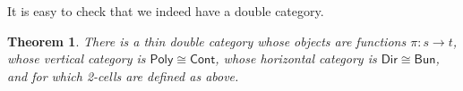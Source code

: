 \documentclass[11pt, article, one side]{memoir}
\theoremstyle{theorem}
\newtheorem{theorem}[equation]{Theorem}
\theoremstyle{definition}
\theoremstyle{remark}
\newcommand{\Cat}[1]{\mathsf{#1}}%
\newcommand{\smset}{\Cat{Set}}
\newcommand{\cont}{\Cat{Cont}}
\newcommand{\bun}{\Cat{Bun}}
\newcommand{\poly}{\Cat{Poly}}
\newcommand{\dir}{\Cat{Dir}}
\begin{document}
It is easy to check that we indeed have a double category.
\begin{theorem}
There is a thin double category whose objects are functions $\pi\colon s\to t$, whose vertical category is $\poly\cong\cont$, whose horizontal category is $\dir\cong\bun$, and for which 2-cells are defined as above.
\end{theorem}



%
\end{document}
